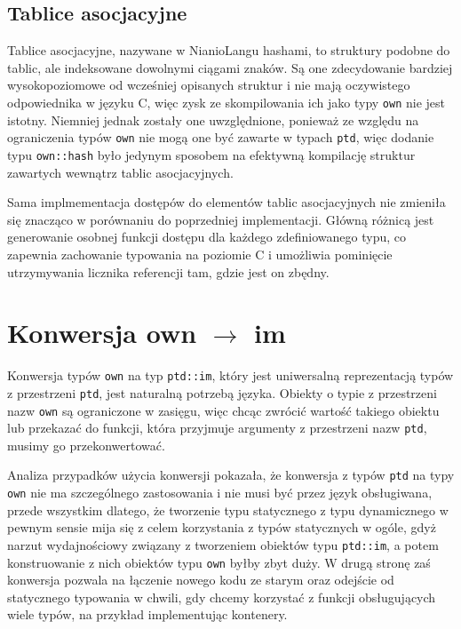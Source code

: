 \documentclass[licencjacka]{pracamgr}
\begin{document}
\subsection{Tablice asocjacyjne}
Tablice asocjacyjne, nazywane w NianioLangu hashami, to struktury podobne do tablic, ale indeksowane dowolnymi
ciągami znaków. Są one zdecydowanie bardziej wysokopoziomowe od wcześniej opisanych struktur i nie mają
oczywistego odpowiednika w języku C, więc zysk ze skompilowania ich jako typy \texttt{own} nie jest istotny.
Niemniej jednak zostały one uwzględnione, ponieważ ze względu na ograniczenia typów \texttt{own} nie mogą
one być zawarte w typach \texttt{ptd}, więc dodanie typu \texttt{own::hash} było jedynym sposobem na efektywną
kompilację struktur zawartych wewnątrz tablic asocjacyjnych.

Sama implmementacja dostępów do elementów tablic asocjacyjnych nie zmieniła się znacząco w porównaniu
do poprzedniej implementacji. Główną różnicą jest generowanie osobnej funkcji dostępu dla każdego zdefiniowanego
typu, co zapewnia zachowanie typowania na poziomie C i umożliwia pominięcie utrzymywania licznika referencji
tam, gdzie jest on zbędny.

\section{Konwersja own $\rightarrow$ im}
\label{sec:own_to_im}
Konwersja typów \texttt{own} na typ \texttt{ptd::im}, który jest uniwersalną reprezentacją typów z przestrzeni \texttt{ptd},
jest naturalną potrzebą języka. Obiekty o typie z przestrzeni nazw \texttt{own} są ograniczone w zasięgu,
więc chcąc zwrócić wartość takiego obiektu lub przekazać do funkcji, która przyjmuje argumenty z przestrzeni
nazw \texttt{ptd}, musimy go przekonwertować.

Analiza przypadków użycia konwersji pokazała, że konwersja z typów \texttt{ptd} na typy \texttt{own} nie ma 
szczególnego zastosowania i nie musi być przez język obsługiwana, przede wszystkim dlatego,
że tworzenie typu statycznego z typu dynamicznego w pewnym sensie mija się z celem korzystania z typów statycznych w ogóle,
gdyż narzut wydajnościowy związany z tworzeniem obiektów typu \texttt{ptd::im}, a potem konstruowanie z nich obiektów typu \texttt{own} byłby zbyt duży.
W drugą stronę zaś konwersja pozwala na łączenie nowego kodu ze starym oraz odejście od statycznego typowania w chwili,
gdy chcemy korzystać z funkcji obsługujących wiele typów, na przykład implementując kontenery.
\end{document}
